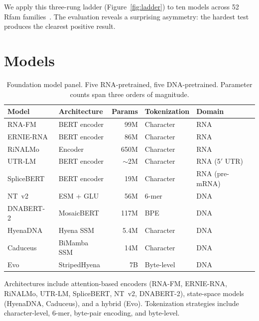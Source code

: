 \documentclass[11pt]{article}
\begin{document}
We apply this three-rung ladder (Figure~\ref{fig:ladder}) to ten
models across 52 Rfam families~\citep{rfam2021}. The
evaluation reveals a surprising asymmetry: the hardest test produces
the clearest positive result.


\section{Models}

\begin{table}[htbp]
\centering
\caption{Foundation model panel. Five RNA-pretrained, five
DNA-pretrained. Parameter counts span three orders of magnitude.}
\label{tab:models}
\small
\begin{tabular}{llrll}
\toprule
\textbf{Model} & \textbf{Architecture} & \textbf{Params} & \textbf{Tokenization} & \textbf{Domain} \\
\midrule
RNA-FM~\citep{rnafm2022}         & BERT encoder       & 99M  & Character   & RNA \\
ERNIE-RNA~\citep{ernierna2025}   & BERT encoder       & 86M  & Character   & RNA \\
RiNALMo~\citep{rinalmo2025}     & Encoder            & 650M & Character   & RNA \\
UTR-LM~\citep{utrlm2024}        & BERT encoder       & $\sim$2M & Character & RNA (5$'$ UTR) \\
SpliceBERT~\citep{splicebert2024} & BERT encoder     & 19M  & Character   & RNA (pre-mRNA) \\
NT~v2~\citep{ntv22024}           & ESM + GLU          & 56M  & 6-mer       & DNA \\
DNABERT-2~\citep{dnabert22024}   & MosaicBERT         & 117M & BPE         & DNA \\
HyenaDNA~\citep{hyenadna2023}   & Hyena SSM          & 5.4M & Character   & DNA \\
Caduceus~\citep{caduceus2024}    & BiMamba SSM        & 14M  & Character   & DNA \\
Evo~\citep{evo2024}              & StripedHyena       & 7B   & Byte-level  & DNA \\
\bottomrule
\end{tabular}
\end{table}

Architectures include attention-based encoders (RNA-FM, ERNIE-RNA,
RiNALMo, UTR-LM, SpliceBERT, NT~v2, DNABERT-2), state-space models
(HyenaDNA, Caduceus), and a hybrid (Evo). Tokenization strategies
include character-level, 6-mer, byte-pair encoding, and byte-level.
\end{document}
